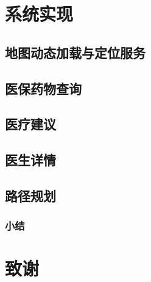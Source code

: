 \documentclass[fleqn,10pt]{IntroToAI} %
\begin{document}
\section{系统实现}
\subsection{地图动态加载与定位服务}
\subsection{医保药物查询}
\subsection{医疗建议}
\subsection{医生详情}
\subsection{路径规划}
\subsubsection{小结}
\section*{致谢} 





\end{document}
